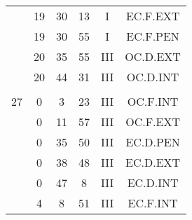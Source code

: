 \documentclass[12pt, a4paper]{article}
\begin{document}
\begin{multicols}{3}
{\begin{tabular}{c c c c c c}
	 	 	 	 & 19 & 30 & 13 & I & EC.F.EXT\\%
	 	 	 	 & 19 & 30 & 55 & I & EC.F.PEN\\%
	 	 	 	 & 20 & 35 & 55 & III & OC.D.EXT\\%
	 	 	 	 & 20 & 44 & 31 & III & OC.D.INT\\%
	 	 	 	 & & & & & \\%
	 	 	 	27 & 0 & 3 & 23 & III & OC.F.INT\\%
	 	 	 	 & 0 & 11 & 57 & III & OC.F.EXT\\%
	 	 	 	 & 0 & 35 & 50 & III & EC.D.PEN\\%
	 	 	 	 & 0 & 38 & 48 & III & EC.D.EXT\\%
	 	 	 	 & 0 & 47 & 8 & III & EC.D.INT\\%
	 	 	 	 & 4 & 8 & 51 & III & EC.F.INT\\%
	 	 \end{tabular}
 	}
\end{multicols}
\end{document}
